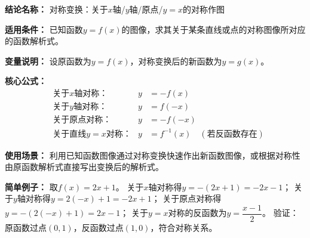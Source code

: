 \textbf{结论名称：} 对称变换：关于$x$轴/$y$轴/原点/$y=x$的对称作图

\textbf{适用条件：} 已知函数$y=f(x)$的图像，求其关于某条直线或点的对称图像所对应的函数解析式。

\textbf{变量说明：} 设原函数为$y=f(x)$，对称变换后的新函数为$y=g(x)$。

\textbf{核心公式：}
\[
\boxed{
\begin{aligned}
&\text{关于}x\text{轴对称：}& y &= -f(x)\\
&\text{关于}y\text{轴对称：}& y &= f(-x)\\
&\text{关于原点对称：}& y &= -f(-x)\\
&\text{关于直线}y=x\text{对称：}& y &= f^{-1}(x) \quad (\text{若反函数存在})
\end{aligned}
}
\]

\textbf{使用场景：} 利用已知函数图像通过对称变换快速作出新函数图像，或根据对称性由原函数解析式直接写出变换后的解析式。

\textbf{简单例子：} 取$f(x)=2x+1$。  
关于$x$轴对称得$y=-(2x+1)=-2x-1$；  
关于$y$轴对称得$y=2(-x)+1=-2x+1$；  
关于原点对称得$y=-(2(-x)+1)=2x-1$；  
关于$y=x$对称的反函数为$y=\dfrac{x-1}{2}$。  
验证：原函数过点$(0,1)$，反函数过点$(1,0)$，符合对称关系。